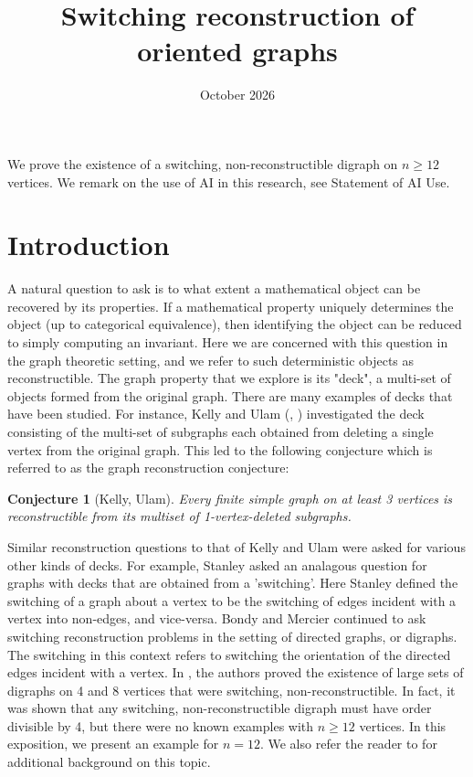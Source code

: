 \documentclass[11pt]{article}
\date{October 2026}
\title[Short Title for the Running Head]{Switching reconstruction of oriented graphs}
\newtheorem{con}[thm]{Conjecture}
\theoremstyle{definition}
\numberwithin{equation}{section}
\begin{document}
\maketitle

We prove the existence of a switching, non-reconstructible digraph on $n \geq 12$ vertices.
We remark on the use of AI in this research, see Statement of AI Use.

\section{Introduction}
\begin{humanblock}
A natural question to ask is to what extent a mathematical object can be recovered by its properties. If a mathematical property uniquely determines the object (up to categorical equivalence), then identifying the object can be reduced to simply computing an invariant. Here we are concerned with this question in the graph theoretic setting, and we refer to such deterministic objects as reconstructible. The graph property that we explore is its "deck", a multi-set of objects formed from the original graph. There are many examples of decks that have been studied. For instance, Kelly and Ulam (\cite{Kelly1957}, \cite{Ulam1960}) investigated the deck consisting of the multi-set of subgraphs each obtained from deleting a single vertex from the original graph. This led to the following conjecture which is referred to as the graph reconstruction conjecture: 

\begin{con}[Kelly, Ulam]
    Every finite simple graph on at least 3 vertices is reconstructible from its multiset of 1-vertex-deleted subgraphs.
\end{con}

Similar reconstruction questions to that of Kelly and Ulam were asked for various other kinds of decks. For example, Stanley \cite{Stanley1985} asked an analagous question for graphs with decks that are obtained from a 'switching'. Here Stanley defined the switching of a graph about a vertex to be the switching of edges incident with a vertex into non-edges, and vice-versa. Bondy and Mercier \cite{BondyMercier2011} continued to ask switching reconstruction problems in the setting of directed graphs, or digraphs. The switching in this context refers to switching the orientation of the directed edges incident with a vertex. In \cite{BondyMercier2011}, the authors proved the existence of large sets of digraphs on 4 and 8 vertices that were switching, non-reconstructible. In fact, it was shown that any switching, non-reconstructible digraph must have order divisible by 4, but there were no known examples with $n \geq 12$ vertices. In this exposition, we present an example for $n=12$. We also refer the reader to \cite{McKaySchweitzer2014} for additional background on this topic. 


\end{humanblock}
\end{document}

